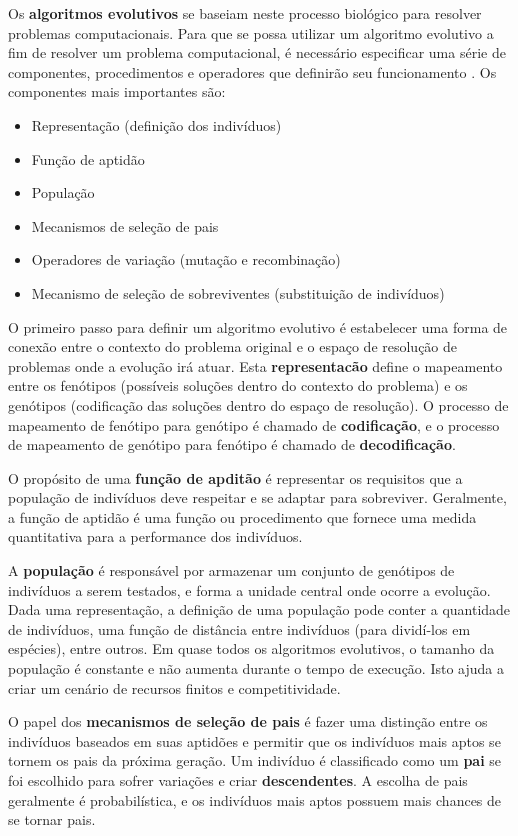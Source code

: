 Os \textbf{algoritmos evolutivos} se baseiam neste processo biológico para
resolver problemas computacionais. Para que se possa utilizar um algoritmo
evolutivo a fim de resolver um problema computacional, é necessário especificar
uma série de componentes, procedimentos e operadores que definirão seu
funcionamento \cite[Cap. 3]{IntroEvolComputing}. Os componentes mais importantes
são:

\begin{itemize}
	\item Representação (definição dos indivíduos)
	\item Função de aptidão
	\item População
	\item Mecanismos de seleção de pais
	\item Operadores de variação (mutação e recombinação)
	\item Mecanismo de seleção de sobreviventes (substituição de indivíduos)
\end{itemize}

O primeiro passo para definir um algoritmo evolutivo é estabelecer uma forma de
conexão entre o contexto do problema original e o espaço de resolução de
problemas onde a evolução irá atuar. Esta \textbf{representacão} define o
mapeamento entre os fenótipos (possíveis soluções dentro do contexto do
problema) e os genótipos (codificação das soluções dentro do espaço de
resolução). O processo de mapeamento de fenótipo para genótipo é chamado de
\textbf{codificação}, e o processo de mapeamento de genótipo para fenótipo é
chamado de \textbf{decodificação}.

O propósito de uma \textbf{função de apditão} é representar os requisitos que a
população de indivíduos deve respeitar e se adaptar para sobreviver. Geralmente,
a função de aptidão é uma função ou procedimento que fornece uma medida
quantitativa para a performance dos indivíduos.

A \textbf{população} é responsável por armazenar um conjunto de genótipos de
indivíduos a serem testados, e forma a unidade central onde ocorre a evolução.
Dada uma representação, a definição de uma população pode conter a quantidade de
indivíduos, uma função de distância entre indivíduos (para dividí-los em
espécies), entre outros. Em quase todos os algoritmos evolutivos, o tamanho da
população é constante e não aumenta durante o tempo de execução. Isto ajuda a
criar um cenário de recursos finitos e competitividade. 

O papel dos \textbf{mecanismos de seleção de pais} é fazer uma distinção entre
os indivíduos baseados em suas aptidões e permitir que os indivíduos mais aptos
se tornem os pais da próxima geração. Um indivíduo é classificado como um
\textbf{pai} se foi escolhido para sofrer variações e criar
\textbf{descendentes}. A escolha de pais geralmente é probabilística, e os
indivíduos mais aptos possuem mais chances de se tornar pais.

